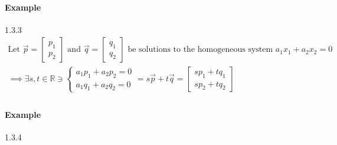 \paragraph*{Example} 1.3.3
\begin{align*}
    \text{Let } \vec{p} = \begin{bmatrix} p_1 \\ p_2 \end{bmatrix} \text{ and } \vec{q} = \begin{bmatrix} q_1 \\ q_2 \end{bmatrix} \text{ be solutions to the homogeneous system } a_1x_1 + a_2x_2 = 0 \\
    \implies \exists s, t \in \mathbb{R} \ni \begin{cases}
        a_1p_1 + a_2p_2 = 0 \\
        a_1q_1 + a_2q_2 = 0
    \end{cases} = s\vec{p} + t\vec{q} = \begin{bmatrix}
        sp_1 + tq_1 \\
        sp_2 + tq_2
    \end{bmatrix} \\
\end{align*}

\paragraph*{Example} 1.3.4 %